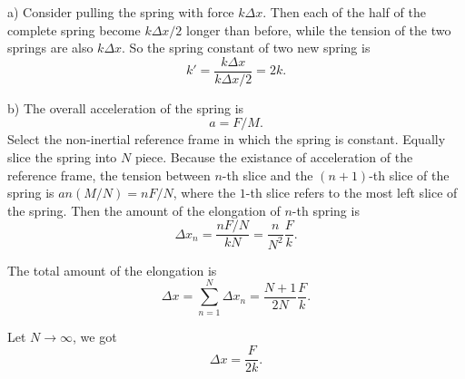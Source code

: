 \documentclass{article}
\begin{document}
\begin{solution}
	a) Consider pulling the spring with force $k \Delta x$. Then each of the half of the complete spring become $k \Delta x/2$ longer than before, while the tension of the two springs are also $k\Delta x$. So the spring constant of two new spring is
	\[ k' = \frac{k\Delta x}{k\Delta x/2} = 2k. \]

	b) The overall acceleration of the spring is
	\[ a = F/M. \]
	Select the non-inertial reference frame in which the spring is constant. Equally slice the spring into $N$ piece. Because the existance of acceleration of the reference frame, the tension between $n$-th slice and the $(n+1)$-th slice of the spring is $an(M/N) = nF/N$, where the $1$-th slice refers to the most left slice of the spring. Then the amount of the elongation of $n$-th spring is
	\[ \Delta x_n = \frac{nF/N}{kN} = \frac{n}{N^2} \frac{F}{k}. \]

	The total amount of the elongation is
	\[ \Delta x = \sum_{n=1}^{N}\Delta x_n = \frac{N+1}{2N} \frac{F}{k}. \]

	Let $N \to \infty$, we got
	\[ \Delta x = \frac{F}{2k}. \]
\end{solution}
\end{document}
